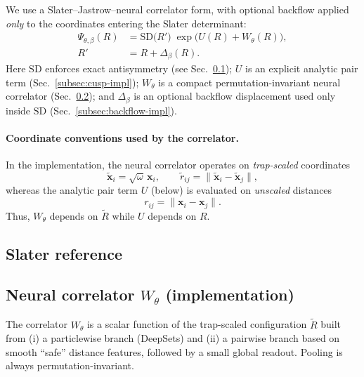 \documentclass[superscriptaddress,unsortedaddress,amsmath,amssymb,aps]{revtex4-2}
\begin{document}
We use a Slater--Jastrow--neural correlator form, with optional backflow applied \emph{only} to the coordinates
entering the Slater determinant:
\begin{align}
  \Psi_{\theta,\beta}(R)
  &= \mathrm{SD}\!\big(R'\big)\;
     \exp\!\Big(
       U(R) + W_\theta(R)
     \Big),\label{eq:ansatz-overall-impl}\\
  R' &= R + \Delta_\beta(R).\label{eq:bf-coords-impl}
\end{align}
Here $\mathrm{SD}$ enforces exact antisymmetry (see Sec.~\ref{subsec:slater}); $U$ is an explicit analytic
pair term (Sec.~\ref{subsec:cusp-impl}); $W_\theta$ is a compact permutation-invariant neural correlator
(Sec.~\ref{subsec:nqs-impl}); and $\Delta_\beta$ is an optional backflow displacement used only inside $\mathrm{SD}$
(Sec.~\ref{subsec:backflow-impl}).

\paragraph{Coordinate conventions used by the correlator.}
In the implementation, the neural correlator operates on \emph{trap-scaled} coordinates
\begin{equation}
  \tilde{\mathbf x}_i = \sqrt{\omega}\,\mathbf x_i,
  \qquad
  \tilde r_{ij}=\|\tilde{\mathbf x}_i-\tilde{\mathbf x}_j\|,
\end{equation}
whereas the analytic pair term $U$ (below) is evaluated on \emph{unscaled} distances
\begin{equation}
  r_{ij}=\|\mathbf x_i-\mathbf x_j\|.
\end{equation}
Thus, $W_\theta$ depends on $\tilde R$ while $U$ depends on $R$.

\subsection{Slater reference}
\label{subsec:slater}

\subsection{Neural correlator $W_\theta$ (implementation)}
\label{subsec:nqs-impl}

The correlator $W_\theta$ is a scalar function of the trap-scaled configuration $\tilde R$ built from
(i) a particlewise branch (DeepSets) and (ii) a pairwise branch based on smooth ``safe'' distance features,
followed by a small global readout. Pooling is always permutation-invariant.
\end{document}
